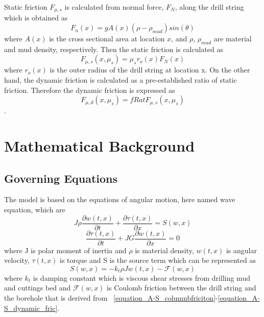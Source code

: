 Static friction $F_{\mu,s}$ is calculated from normal force, $F_N$, along the drill string which is obtained as
\begin{equation}\label{equation_AS_normal_force}
  F_n(x) = gA(x)(\rho-\rho_{mud})sin(\theta)
\end{equation}
where $A(x)$ is the cross sectional area at location $x$, and $\rho$, $\rho_{mud}$ are material and mud density, respectively.
Then the static friction is calculated as
\begin{equation}\label{equation_A-S_static_fric}
  F_{\mu,s}(x,\mu_s) = \mu_sr_o(x)F_N(x)
\end{equation}
where $r_o(x)$ is the outer radius of the drill string at location x.
On the other hand, the dynamic friction is calculated as a pre-established ratio of static friction. Therefore the dynamic friction is expressed as
\begin{equation}\label{equation_A-S_dynamic_fric}
  F_{\mu,d}(x,\mu_s) = fRat F_{\mu,s}(x,\mu_s)
\end{equation}.

\section{Mathematical Background}\label{SubSec_AS_mathematicalbackground}
\subsection{Governing Equations}
The model is based on the equations of angular motion, here named wave equation, which are
\begin{equation}\label{AS-motion}
  J\rho\frac{\partial w(t,x)}{\partial t} + \frac{\partial \tau (t,x)}{\partial x} = S(w,x)
\end{equation}
\begin{equation}\label{AS-motion1}
 \frac{\partial\tau(t,x)}{\partial t} + JG\frac{\partial w(t,x)}{\partial x} = 0
\end{equation}
where J is polar moment of inertia and $\rho$ is material density, $w(t,x)$ is angular velocity, $\tau(t,x)$ is torque and S is the source term which can be represented as
\begin{equation}\label{AS-sourceterm}
  S(w,x) = -k_t \rho J w(t,x) - \mathcal{F}(w,x)
\end{equation}
where $k_t$ is damping constant which is viscous shear stresses from drilling mud and cuttings bed and $\mathcal{F}(w,x)$ is Coulomb friction between the drill string and the borehole that is derived from \equationname~\ref{equation_A-S_columnbfriciton}-\ref{equation_A-S_dynamic_fric}.

